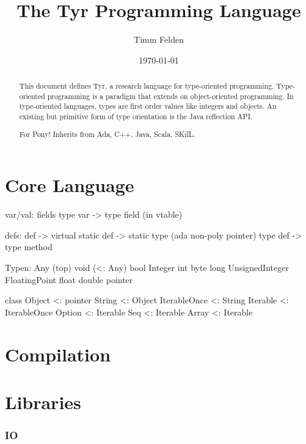 \documentclass[a4paper,10pt]{article}
\title{The Tyr Programming Language}
\author{Timm Felden}
\date{\today}
\begin{document}
\maketitle

\begin{abstract}
This document defines Tyr, a research language for type-oriented programming.
Type-oriented programming is a paradigm that extends on object-oriented programming.
In type-oriented languages, types are first order values like integers and objects.
An existing but primitive form of type orientation is the Java reflection API.
\end{abstract}

\renewcommand{\abstractname}{Acknowledgements}
\begin{abstract}
For Pony!
Inherits from Ada, C++, Java, Scala, SKilL.
\end{abstract}

\tableofcontents

\newpage
\part{Core Language}
\label{part:spec}







var/val:
  fields
  type var -> type field (in vtable)

defs:
 def -> virtual
 static def -> static type (ada non-poly pointer)
 type def -> type method


Typen:
 Any (top)
 void (<: Any)
 bool
 Integer
 int
 byte
 long
 UnsignedInteger
 FloatingPoint
 float
 double
 pointer
 
class Object <: pointer
  String <: Object
  IterableOnce <: String
  Iterable <: IterableOnce
  Option <: Iterable
  Seq <: Iterable
  Array <: Iterable


\part{Compilation}





\part{Libraries}

\section{IO}
\end{document}

